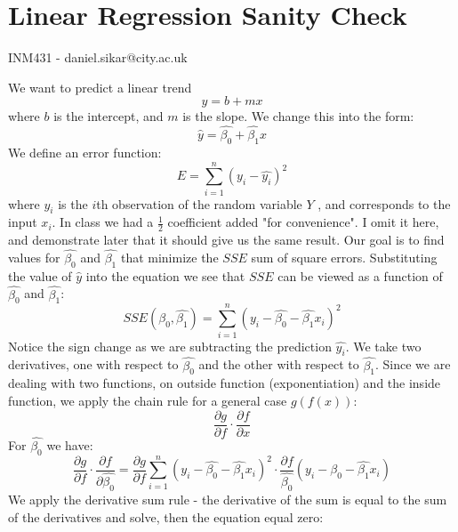 \documentclass{article}
\begin{document}
\section*{Linear Regression Sanity Check}
INM431 - daniel.sikar@city.ac.uk  


We want to predict a linear trend
$$
y = b + mx
$$
where $b$ is the intercept, and $m$ is the slope. 
We change this into the form:
$$
\hat{y} = \hat{\beta_{0}} + \hat{\beta_{1}}x
$$
We define an error function:
$$ 
E = \sum_{i=1}^{n} (y_i - \hat{y_i})^2 
$$
where $y_i$ is the $i$th observation of the random variable $Y$ , and corresponds to the input $x_i$. In class we had a $\frac{1}{2}$ coefficient added "for convenience". I omit it here, and demonstrate later that it should give us the same result.
Our goal is to find values for $\hat{\beta_{0}}$ and $\hat{\beta_{1}}$ that minimize the $SSE$ sum of square errors.
Substituting the value of $\hat{y}$ into the equation we see that $SSE$ can be viewed as a function of $\hat{\beta_{0}}$ and $\hat{\beta_{1}}$:
$$
SSE(\hat{\beta_0},\hat{\beta_1}) = \sum_{i=1}^{n} (y_i - \hat{\beta_{0}} - \hat{\beta_{1}}x_i)^2 
$$
Notice the sign change as we are subtracting the prediction $\hat{y_i}$.
We take two derivatives, one with respect to $\hat{\beta_0}$ and the other with respect to $\hat{\beta_1}$. Since we are dealing with two functions, on outside function (exponentiation) and the inside function, we apply the chain rule for a general case $g(f(x))$:
$$
\frac{\partial g}{\partial f}\cdot\frac{\partial f}{\partial x}
$$
For $\hat{\beta_0}$ we have:
$$
\frac{\partial g}{\partial f}\cdot\frac{\partial f} {\partial \hat{\beta_0}} = 
\frac{\partial g}{\partial f} \sum_{i=1}^{n} (y_i - \hat{\beta_{0}} - \hat{\beta_{1}}x_i)^2 \cdot \frac{\partial f} {\hat{\beta_0}} (y_i - \hat{\beta_{0}} - \hat{\beta_{1}}x_i)
$$
We apply the derivative sum rule - the derivative of the sum is equal to the sum of the derivatives and solve, then the equation equal zero:

\end{document}
